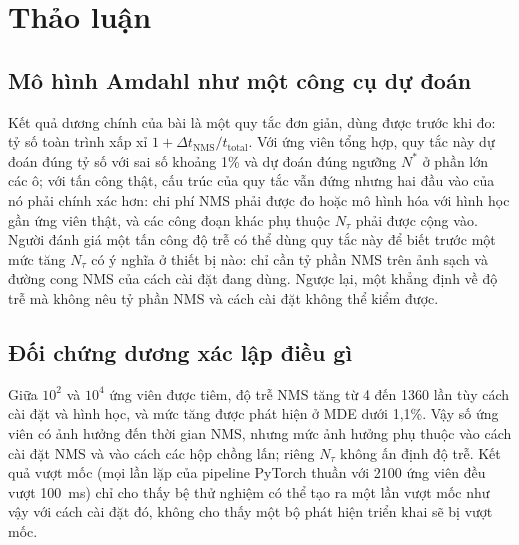 \documentclass[a4paper,fleqn]{cas-dc}
\newcommand{\Ntau}{N_{\tau}}
\begin{document}
\section{Thảo luận}
\label{sec:discussion}
\subsection{Mô hình Amdahl như một công cụ dự đoán}
Kết quả dương chính của bài là một quy tắc đơn giản, dùng được trước khi đo: tỷ số toàn trình xấp xỉ $1 + \Delta t_{\mathrm{NMS}}/t_{\mathrm{total}}$. Với ứng viên tổng hợp, quy tắc này dự đoán đúng tỷ số với sai số khoảng 1\% và dự đoán đúng ngưỡng $N^{*}$ ở phần lớn các ô; với tấn công thật, cấu trúc của quy tắc vẫn đứng nhưng hai đầu vào của nó phải chính xác hơn: chi phí NMS phải được đo hoặc mô hình hóa với hình học gần ứng viên thật, và các công đoạn khác phụ thuộc $\Ntau$ phải được cộng vào. Người đánh giá một tấn công độ trễ có thể dùng quy tắc này để biết trước một mức tăng $\Ntau$ có ý nghĩa ở thiết bị nào: chỉ cần tỷ phần NMS trên ảnh sạch và đường cong NMS của cách cài đặt đang dùng. Ngược lại, một khẳng định về độ trễ mà không nêu tỷ phần NMS và cách cài đặt không thể kiểm được.

\subsection{Đối chứng dương xác lập điều gì}
Giữa $10^2$ và $10^4$ ứng viên được tiêm, độ trễ NMS tăng từ 4 đến 1360 lần tùy cách cài đặt và hình học, và mức tăng được phát hiện ở MDE dưới 1,1\%. Vậy số ứng viên có ảnh hưởng đến thời gian NMS, nhưng mức ảnh hưởng phụ thuộc vào cách cài đặt NMS và vào cách các hộp chồng lấn; riêng $\Ntau$ không ấn định độ trễ. Kết quả vượt mốc (mọi lần lặp của pipeline PyTorch thuần với 2100 ứng viên đều vượt 100~ms) chỉ cho thấy bệ thử nghiệm có thể tạo ra một lần vượt mốc như vậy với cách cài đặt đó, không cho thấy một bộ phát hiện triển khai sẽ bị vượt mốc.
\end{document}
